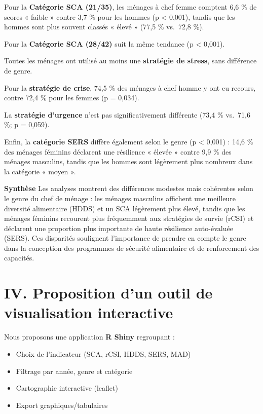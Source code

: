\documentclass[
]{article}
\providecommand{\tightlist}{%
  \setlength{\itemsep}{0pt}\setlength{\parskip}{0pt}}
\begin{document}
Pour la \textbf{Catégorie SCA (21/35)}, les ménages à chef femme
comptent 6,6 \% de scores « faible » contre 3,7 \% pour les hommes (p
\textless{} 0,001), tandis que les hommes sont plus souvent classés «
élevé » (77,5 \% vs.~72,8 \%).

Pour la \textbf{Catégorie SCA (28/42)} suit la même tendance (p
\textless{} 0,001).

Toutes les ménages ont utilisé au moins une \textbf{stratégie de
stress}, sans différence de genre.

Pour la \textbf{stratégie de crise}, 74,5 \% des ménages à chef homme y
ont eu recours, contre 72,4 \% pour les femmes (p = 0,034).

La \textbf{stratégie d'urgence} n'est pas significativement différente
(73,4 \% vs.~71,6 \%; p = 0,059).

Enfin, la \textbf{catégorie SERS} diffère également selon le genre (p
\textless{} 0,001) : 14,6 \% des ménages féminins déclarent une
résilience « élevée » contre 9,9 \% des ménages masculins, tandis que
les hommes sont légèrement plus nombreux dans la catégorie « moyen ».

\textbf{Synthèse} Les analyses montrent des différences modestes mais
cohérentes selon le genre du chef de ménage : les ménages masculins
affichent une meilleure diversité alimentaire (HDDS) et un SCA
légèrement plus élevé, tandis que les ménages féminins recourent plus
fréquemment aux stratégies de survie (rCSI) et déclarent une proportion
plus importante de haute résilience auto-évaluée (SERS). Ces disparités
soulignent l'importance de prendre en compte le genre dans la conception
des programmes de sécurité alimentaire et de renforcement des capacités.

\newpage

\hypertarget{iv.-proposition-dun-outil-de-visualisation-interactive}{%
\section{IV. Proposition d'un outil de visualisation
interactive}\label{iv.-proposition-dun-outil-de-visualisation-interactive}}

Nous proposons une application \textbf{R Shiny} regroupant :

\begin{itemize}
\tightlist
\item
  Choix de l'indicateur (SCA, rCSI, HDDS, SERS, MAD)
\item
  Filtrage par année, genre et catégorie
\item
  Cartographie interactive (leaflet)
\item
  Export graphiques/tabulaires
\end{itemize}
\end{document}
